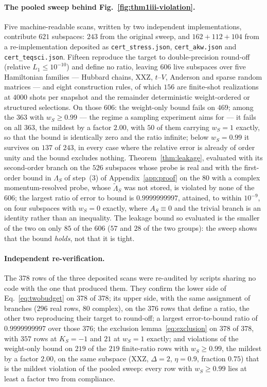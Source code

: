 \paragraph{The pooled sweep behind Fig.~\ref{fig:thm1iii-violation}.} Five machine-readable scans,
written by two independent implementations, contribute $621$ subspaces: $243$ from the original sweep,
and $162+112+104$ from a re-implementation deposited as \texttt{cert\_stress.json},
\texttt{cert\_akw.json} and \texttt{cert\_teqsci.json}. Fifteen reproduce the target to
double-precision round-off (relative $L_1\le10^{-10}$) and define no ratio, leaving $606$ live
subspaces over five Hamiltonian families --- Hubbard chains, XXZ, $t$--$V$, Anderson and sparse random
matrices --- and eight construction rules, of which $156$ are finite-shot realizations at $4000$ shots
per snapshot and the remainder deterministic weight-ordered or structured selections. On those $606$:
the weight-only bound fails on $469$; among the $363$ with $w_S\ge0.99$ --- the regime a sampling
experiment aims for --- it fails on all $363$, the mildest by a factor $2.00$, with $50$ of them carrying $w_S=1$
exactly, so that the bound is identically zero and the ratio infinite; below $w_S=0.99$ it survives on
$137$ of $243$, in every case where the relative error is already of order unity and the bound excludes
nothing. Theorem~\ref{thm:leakage}, evaluated with its second-order branch on the $526$ subspaces whose
probe is real and with the first-order bound in $\Lambda_S$ of step~(3) of Appendix~\ref{app:proof} on the $80$ with a complex momentum-resolved probe, whose
$\tilde\Lambda_S$ was not stored, is violated by none of the $606$; the largest ratio of error to
bound is $0.9999999997$, attained, to within $10^{-9}$, on four subspaces with $w_S=0$ exactly, where $A_S\equiv0$ and the
trivial branch is an identity rather than an inequality. The leakage bound so evaluated is the smaller of the two
on only $85$ of the $606$ ($57$ and $28$ of the two groups): the sweep shows that the bound \emph{holds}, not that it is tight.

\paragraph{Independent re-verification.} The $378$ rows of the three deposited scans were re-audited by scripts sharing no code with the one that produced them. They confirm the lower side of Eq.~\eqref{eq:twobudget} on $378$ of
$378$; its upper side, with the same assignment of branches ($296$ real rows, $80$ complex), on the $376$ rows
that define a ratio, the other two reproducing their target to round-off; a largest error-to-bound ratio of $0.9999999997$ over
those $376$; the exclusion lemma~\eqref{eq:exclusion} on $378$ of $378$, with $357$
rows at $K_S=-1$ and $21$ at $w_S=1$ exactly; and violations of the weight-only bound on $219$ of the
$219$ finite-ratio rows with $w_S\ge0.99$, the mildest by a factor $2.00$, on the same subspace (XXZ, $\Delta=2$, $\eta=0.9$, fraction $0.75$) that
is the mildest violation of the pooled sweep: every row with $w_S\ge0.99$ lies at least a factor two from
compliance.
